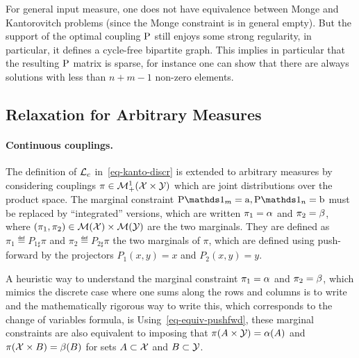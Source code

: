 \begin{rem} For general input measure, one does not have equivalence between Monge and Kantorovitch problems (since the Monge constraint is in general empty). But the support of the optimal coupling $\P$ still enjoys some strong regularity, in particular, it defines a cycle-free bipartite graph. This implies in particular that the resulting $\P$ matrix is sparse, for instance one can show that there are always solutions with less than $n+m-1$ non-zero elements.	
\end{rem}

\subsection{Relaxation for Arbitrary Measures}

\paragraph{Continuous couplings.}

The definition of $\MK_\c$ in~\eqref{eq-kanto-discr} is extended to arbitrary measures by considering couplings $\pi \in \Mm_+^1(\X \times \Y)$ which are joint distributions over the product space. 
%
The marginal constraint $\P\ones_m=\a, \P\ones_n=\b$ must be replaced by ``integrated'' versions, which are written $\pi_1 = \al$ and $\pi_2 = \be$, where $(\pi_1,\pi_2) \in \Mm(\Xx) \times \Mm(\Yy)$ are the two marginals. 
%
They are defined as $\pi_1 \eqdef P_{1\sharp} \pi$ and $\pi_2 \eqdef P_{2\sharp} \pi$ the two marginals of $\pi$, which are defined using push-forward by the projectors $P_1(x,y)=x$ and $P_2(x,y)=y$.

A heuristic way to understand the marginal constraint $\pi_1 = \al$ and $\pi_2 = \be$, which mimics the discrete case where one sums along the rows and columns is to write
and the mathematically rigorous way to write this, which corresponds to the change of variables formula, is 
%
Using~\eqref{eq-equiv-pushfwd}, these marginal constraints are also equivalent to imposing that $\pi(A \times \Y)=\al(A)$ and $\pi(\X \times B)=\be(B)$ for sets $A \subset \X$ and $B \subset \Y$.

